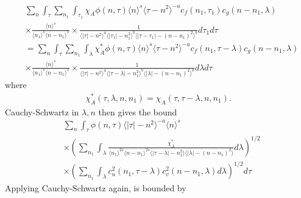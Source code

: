 \documentclass[12pt,reqno]{amsart}
\numberwithin{equation}{section}  %
\renewcommand{\cref}{\Cref}
\begin{document}
\begin{equation*}
	\begin{split}
    & \sum_{n} \int_{\tau}   \sum_{n_{1}}
    \int_{\tau_{1}} \chi_{A}
    \phi(n, \tau) \langle n \rangle^s \langle \tau - n^{2} \rangle^{-a}
  c_f(n_1, \tau_1)
		c_g(n - n_1, \lambda )
		\\
    & \times \frac{\langle n \rangle ^{s}}{\langle n_{1} \rangle ^{s} \langle
    n-n_{1} \rangle ^{s}} \times \frac{1}{\langle |\tau| - n^{2} \rangle
    ^{a}\langle |\tau_{1}|-n_{1}^{2} \rangle ^{b}\langle | \tau -
    \tau_{1}|-(n - n_{1})^{2}
    \rangle ^{b}} d \tau_1 d \tau
    \\
    & = \sum_{n} \int_{\tau}   \sum_{n_{1}}
    \int_{\lambda} \chi^{*}_{A}
    \phi(n, \tau) \langle n \rangle^s \langle \tau - n^{2} \rangle^{-a}
  c_f(n_1, \tau - \lambda)
		c_g(n - n_1, \lambda )
		\\
    & \times \frac{\langle n \rangle ^{s}}{\langle n_{1} \rangle ^{s} \langle
    n-n_{1} \rangle ^{s}} \times \frac{1}{\langle |\tau| - n^{2} \rangle
    ^{a}\langle |\tau - \lambda|-n_{1}^{2} \rangle ^{b}\langle |
    \lambda|-(n - n_{1})^{2}
    \rangle ^{b}} d \lambda  d \tau
	\end{split}
\end{equation*}
where 
%
%
\begin{equation}
  \label{change-of-var}
\begin{split}
  \chi^{*}_{A}(\tau, \lambda, n, n_{1}) =
  \chi_{A}(\tau, \tau - \lambda, n, n_{1}).
\end{split}
\end{equation}
%
%
Cauchy-Schwartz in
$\lambda, n$ then gives the bound
%
%
%
\begin{equation}
	\label{10gk}
	\begin{split}
    & \sum_{n} \int_{\tau} \phi(n, \tau) \langle | \tau | - n^{2} \rangle
    ^{-a} \langle n \rangle ^{s}
    \\
    & \times \left( \sum_{n_{1}} \int_{\lambda}
    \frac{\chi^{*}_{A}}{\langle n_{1} \rangle ^{2s} \langle n-n_{1} \rangle ^{2s} \langle |
    \tau - \lambda | - n_{1}^{2}\rangle  \langle | \lambda | -
    (n - n_{1})^{2} \rangle} d \lambda \right)^{1/2}
    \\
    & \times \left( \sum_{n_{1}} \int_{\lambda} c_{u}^{2}(n_{1}, \tau - \lambda)
    c_{v}^{2}(n - n_{1}, \lambda) d \lambda \right)^{1/2} d \tau
  \end{split}
\end{equation}
%
%
Applying Cauchy-Schwartz again, \cref{10gk} is bounded by
\end{document}
